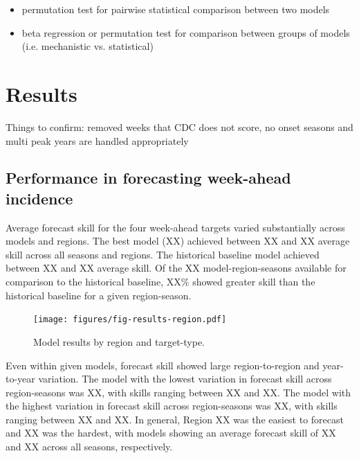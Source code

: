 \documentclass{article}
\begin{document}
\begin{itemize}
    \item permutation test for pairwise statistical comparison between two models
    \item beta regression or permutation test for comparison between groups of models (i.e. mechanistic vs. statistical)
\end{itemize}


\section{Results}

Things to confirm: removed weeks that CDC does not score, no onset seasons and multi peak years are handled appropriately

\subsection{Performance in forecasting week-ahead incidence}

Average forecast skill for the four week-ahead targets varied substantially across models and regions.
The best model (XX) achieved between XX and XX average skill across all seasons and regions.
The historical baseline model achieved between XX and XX average skill.
Of the XX model-region-seasons available for comparison to the historical baseline, XX\% showed greater skill than the historical baseline for a given region-season.

\begin{figure}[htbp]
\begin{center}
\texttt{[image: figures/fig-results-region.pdf]}
\caption{Model results by region and target-type.}
\label{fig:results-region}
\end{center}
\end{figure}


Even within given models, forecast skill showed large region-to-region and year-to-year variation. 
The model with the lowest variation in forecast skill across region-seasons was XX, with skills ranging between XX and XX.
The model with the highest variation in forecast skill across region-seasons was XX, with skills ranging between XX and XX.
In general, Region XX was the easiest to forecast and XX was the hardest, with models showing an average forecast skill of XX and XX across all seasons, respectively.
\end{document}
